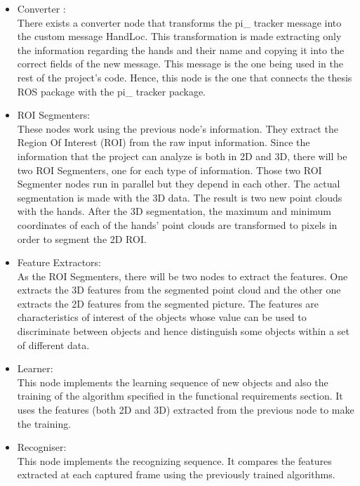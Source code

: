 \documentclass{article}
\begin{document}
\begin{itemize}
\item Converter : \\
There exists a converter node that transforms the pi\_ tracker message into the custom message HandLoc. This transformation is made extracting only the information regarding the hands and their name and copying it into the correct fields of the new message. 
This message is the one being used in the rest of the project's code. Hence, this node is the one that connects the thesis ROS package with the pi\_ tracker package.

\item ROI Segmenters:\\ 
These nodes work using the previous node's information. They extract the Region Of Interest (ROI) from the raw input information. Since the information that the project can analyze is both in 2D and 3D, there will be two ROI Segmenters, one for each type of information. 
Those two ROI Segmenter nodes run in parallel but they depend in each other. The actual segmentation is made with the 3D data. The result is two new point clouds with the hands.
After the 3D segmentation, the maximum and minimum coordinates of each of the hands' point clouds are transformed to pixels in order to segment the 2D ROI. 

\item Feature Extractors: \\
As the ROI Segmenters, there will be two nodes to extract the features. One extracts the 3D features from the segmented point cloud and the other one extracts the 2D features from the segmented picture. 
The features are characteristics of interest of the objects whose value can be used to discriminate between objects and hence distinguish some objects within a set of different data. 


\item Learner: \\
This node implements the learning sequence of new objects and also the training of the algorithm specified in the functional requirements section. 
It uses the features (both 2D and 3D) extracted from the previous node to make the training. 

\item Recogniser:\\ 
This node implements the recognizing sequence. It compares the features extracted at each captured frame using the previously trained algorithms. 
\end{itemize}
   
\end{document}
